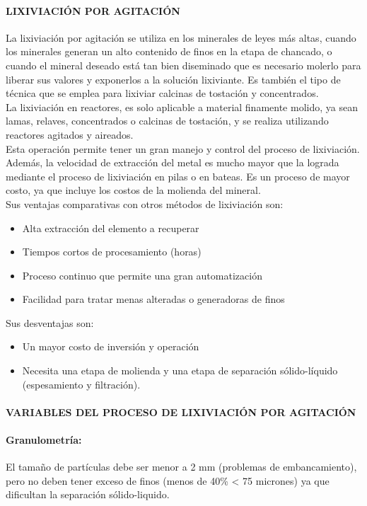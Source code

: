 \paragraph{LIXIVIACI\'ON POR AGITACI\'ON}
La lixiviaci\'on por agitaci\'on se utiliza en los minerales de leyes m\'as altas, cuando los minerales generan un alto contenido de finos en la etapa de chancado, o cuando el mineral deseado está tan bien diseminado que es necesario molerlo para liberar sus valores y exponerlos a la soluci\'on lixiviante. Es tambi\'en el tipo de t\'ecnica que se emplea para lixiviar calcinas de tostaci\'on y concentrados.\\
La lixiviaci\'on en reactores, es solo aplicable a material finamente molido, ya sean lamas, relaves, concentrados o calcinas de tostaci\'on, y se realiza utilizando reactores agitados y aireados.\\
Esta operaci\'on permite tener un gran manejo y control del proceso de lixiviaci\'on. Adem\'as, la velocidad de extracci\'on del metal es mucho mayor que la lograda mediante el proceso de lixiviaci\'on en pilas o en bateas. Es un proceso de mayor costo, ya que incluye los costos de la molienda del mineral.\\
Sus ventajas comparativas con otros m\'etodos de lixiviaci\'on son:
\begin{itemize}
 \item Alta extracci\'on del elemento a recuperar
 \item Tiempos cortos de procesamiento (horas)
 \item Proceso continuo que permite una gran automatizaci\'on
 \item Facilidad para tratar menas alteradas o generadoras de finos
\end{itemize}
Sus desventajas son:
\begin{itemize}
 \item Un mayor costo de inversi\'on y operaci\'on
 \item Necesita una etapa de molienda y una etapa de separaci\'on s\'olido-l\'iquido (espesamiento y filtraci\'on).
\end{itemize}

\paragraph{VARIABLES DEL PROCESO DE LIXIVIACI\'ON POR AGITACI\'ON}

\paragraph{Granulometr\'ia:} 
El tama\~no de part\'iculas debe ser menor a 2 mm (problemas de embancamiento), pero no deben tener exceso de finos (menos de 40\% < 75 micrones) ya que dificultan la separaci\'on s\'olido-liquido.
